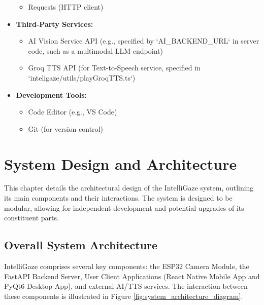 \documentclass[12pt, a4paper]{report}
\begin{document}
\begin{itemize}
\begin{itemize}
            \item Requests (HTTP client)
        \end{itemize}
    \item \textbf{Third-Party Services:}
        \begin{itemize}
            \item AI Vision Service API (e.g., specified by `AI\_BACKEND\_URL` in server code, such as a multimodal LLM endpoint)
            \item Groq TTS API (for Text-to-Speech service, specified in `inteligaze/utils/playGroqTTS.ts`)
        \end{itemize}
    \item \textbf{Development Tools:}
        \begin{itemize}
            \item Code Editor (e.g., VS Code)
            \item Git (for version control)
        \end{itemize}
\end{itemize}

\chapter{System Design and Architecture}
This chapter details the architectural design of the IntelliGaze system, outlining its main components and their interactions. The system is designed to be modular, allowing for independent development and potential upgrades of its constituent parts.

\section{Overall System Architecture}
IntelliGaze comprises several key components: the ESP32 Camera Module, the FastAPI Backend Server, User Client Applications (React Native Mobile App and PyQt6 Desktop App), and external AI/TTS services. The interaction between these components is illustrated in Figure \ref{fig:system_architecture_diagram}.
\end{document}
